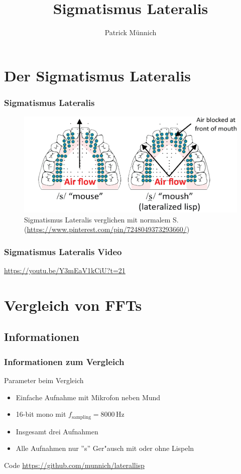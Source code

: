 \documentclass[11pt]{beamer}
\author{Patrick M\"unnich}
\title{Sigmatismus Lateralis}
\institute{Hochschule D\"usseldorf}
\begin{document}
\begin{frame}
\titlepage
\end{frame}

\begin{frame}
\tableofcontents
\end{frame}

\section{Der Sigmatismus Lateralis}

\begin{frame}
\frametitle{Sigmatismus Lateralis}
\begin{figure}
\includegraphics[scale=0.4]{lateral_lisp.png}
\caption{Sigmatismus Lateralis verglichen mit normalem S. (\url{https://www.pinterest.com/pin/7248049373293660/})}
\end{figure}
\end{frame}

\begin{frame}
\frametitle{Sigmatismus Lateralis Video}
\centering
\url{https://youtu.be/Y3mEaV1kCiU?t=21}
\end{frame}

\section{Vergleich von FFTs}

\subsection{Informationen}

\begin{frame}
\frametitle{Informationen zum Vergleich}
\begin{exampleblock}{Parameter beim Vergleich}
\begin{itemize}
\item Einfache Aufnahme mit Mikrofon neben Mund
\item 16-bit mono mit $f_\mathrm{sampling}=8000$\,Hz
\item Insgesamt drei Aufnahmen
\item Alle Aufnahmen nur ''s'' Ger"ausch mit oder ohne Lispeln
\end{itemize}
\end{exampleblock}
\begin{block}{Code}
\url{https://github.com/munnich/laterallisp}
\end{block}
\end{frame}
\end{document}
